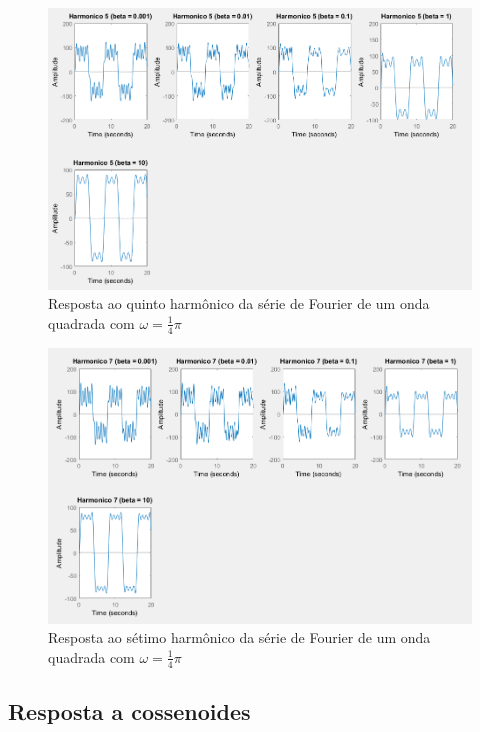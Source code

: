 \documentclass[a4paper, 12pt]{article}
\begin{document}
			\begin{figure}[!ht]
				\centering
				\includegraphics[scale=0.48]{img/3i_beta.png}
				\caption{Resposta ao quinto harmônico da série de Fourier de um onda quadrada com $\omega = \frac{1}{4}\pi$}
			\end{figure}
			\begin{figure}[!ht]
				\centering
				\includegraphics[scale=0.5]{img/3j_beta.png}
				\caption{Resposta ao sétimo harmônico da série de Fourier de um onda quadrada com $\omega = \frac{1}{4}\pi$}
			\end{figure}

	\subsection{Resposta a cossenoides}
\end{document}
